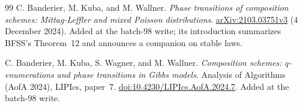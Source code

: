 \documentclass[11pt]{article}
\theoremstyle{remark}\newtheorem{remark}[theorem]{Remark}
\theoremstyle{definition}\newtheorem{definition}[theorem]{Definition}
\begin{document}
\begin{thebibliography}{99}
C. Banderier, M. Kuba, and M. Wallner.
\emph{Phase transitions of composition schemes: Mittag-Leffler and mixed Poisson distributions}.
\href{https://arxiv.org/abs/2103.03751}{arXiv:2103.03751v3} (4 December 2024).
Added at the batch-98 write; its introduction summarizes BFSS's Theorem~12 and announces a companion on stable laws.

C. Banderier, M. Kuba, S. Wagner, and M. Wallner.
\emph{Composition schemes: $q$-enumerations and phase transitions in Gibbs models}.
Analysis of Algorithms (AofA 2024), LIPIcs, paper~7.
\href{https://doi.org/10.4230/LIPIcs.AofA.2024.7}{doi:10.4230/LIPIcs.AofA.2024.7}.
Added at the batch-98 write.
\end{thebibliography}
\endgroup
\end{document}
